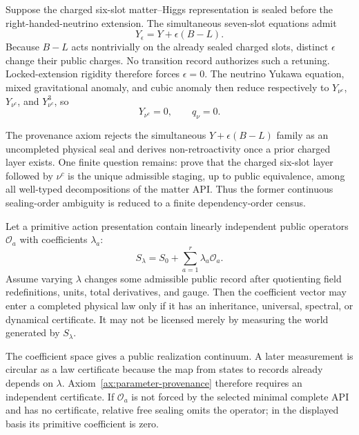 \begin{corollary}
\label{cor:sequential-hypercharge-rigidity}
Suppose the charged six-slot matter--Higgs representation is sealed before the
right-handed-neutrino extension.  The simultaneous seven-slot equations admit
\[
 Y_\epsilon=Y+\epsilon(B-L).
\]
Because \(B-L\) acts nontrivially on the already sealed charged slots, distinct
\(\epsilon\) change their public charges.  No transition record authorizes such a
retuning.  Locked-extension rigidity therefore forces \(\epsilon=0\).  The
neutrino Yukawa equation, mixed gravitational anomaly, and cubic anomaly then reduce
respectively to \(Y_{\nu^c}\), \(Y_{\nu^c}\), and \(Y_{\nu^c}^3\), so
\[
 \boxed{Y_{\nu^c}=0},
 \qquad
 \boxed{q_\nu=0}.
\]
\end{corollary}

\begin{remark}
The provenance axiom rejects the simultaneous \(Y+\epsilon(B-L)\) family as an
uncompleted physical seal and derives non-retroactivity once a prior charged layer
exists.  One finite question remains: prove that the charged six-slot layer followed
by \(\nu^c\) is the unique admissible staging, up to public equivalence, among all
well-typed decompositions of the matter API.  Thus the former continuous
sealing-order ambiguity is reduced to a finite dependency-order census.
\end{remark}

\begin{theorem}
\label{thm:no-bare-action-moduli}
Let a primitive action presentation contain linearly independent public operators
\(\mathcal O_a\) with coefficients \(\lambda_a\):
\[
 S_\lambda=S_0+\sum_{a=1}^r\lambda_a\mathcal O_a .
\]
Assume varying \(\lambda\) changes some admissible public record after quotienting
field redefinitions, units, total derivatives, and gauge.  Then the coefficient
vector may enter a completed physical law only if it has an inheritance, universal,
spectral, or dynamical certificate.  It may not be licensed merely by measuring the
world generated by \(S_\lambda\).
\end{theorem}

\begin{proofsketch}
The coefficient space gives a public realization continuum.  A later measurement is
circular as a law certificate because the map from states to records already depends
on \(\lambda\).  Axiom~\ref{ax:parameter-provenance} therefore requires an
independent certificate.  If \(\mathcal O_a\) is not forced by the selected minimal
complete API and has no certificate, relative free sealing omits the operator; in the
displayed basis its primitive coefficient is zero.
\end{proofsketch}

